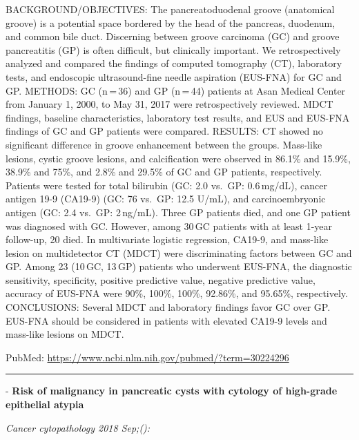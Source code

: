 \documentclass[]{article}
\begin{document}
BACKGROUND/OBJECTIVES: The pancreatoduodenal groove (anatomical groove)
is a potential space bordered by the head of the pancreas, duodenum, and
common bile duct. Discerning between groove carcinoma (GC) and groove
pancreatitis (GP) is often difficult, but clinically important. We
retrospectively analyzed and compared the findings of computed
tomography (CT), laboratory tests, and endoscopic ultrasound-fine needle
aspiration (EUS-FNA) for GC and GP. METHODS: GC (n\,=\,36) and GP
(n\,=\,44) patients at Asan Medical Center from January 1, 2000, to May
31, 2017 were retrospectively reviewed. MDCT findings, baseline
characteristics, laboratory test results, and EUS and EUS-FNA findings
of GC and GP patients were compared. RESULTS: CT showed no significant
difference in groove enhancement between the groups. Mass-like lesions,
cystic groove lesions, and calcification were observed in 86.1\% and
15.9\%, 38.9\% and 75\%, and 2.8\% and 29.5\% of GC and GP patients,
respectively. Patients were tested for total bilirubin (GC: 2.0 vs.~GP:
0.6\,mg/dL), cancer antigen 19-9 (CA19-9) (GC: 76 vs.~GP: 12.5 U/mL),
and carcinoembryonic antigen (GC: 2.4 vs.~GP: 2\,ng/mL). Three GP
patients died, and one GP patient was diagnosed with GC. However, among
30\,GC patients with at least 1-year follow-up, 20 died. In multivariate
logistic regression, CA19-9, and mass-like lesion on multidetector CT
(MDCT) were discriminating factors between GC and GP. Among 23 (10\,GC,
13\,GP) patients who underwent EUS-FNA, the diagnostic sensitivity,
specificity, positive predictive value, negative predictive value,
accuracy of EUS-FNA were 90\%, 100\%, 100\%, 92.86\%, and 95.65\%,
respectively. CONCLUSIONS: Several MDCT and laboratory findings favor GC
over GP. EUS-FNA should be considered in patients with elevated CA19-9
levels and mass-like lesions on MDCT.

PubMed: \url{https://www.ncbi.nlm.nih.gov/pubmed/?term=30224296}

{}

{}

\begin{center}\rule{0.5\linewidth}{\linethickness}\end{center}

 - \textbf{Risk of malignancy in pancreatic cysts with cytology of
high-grade epithelial atypia}

\emph{Cancer cytopathology 2018 Sep;():}
\end{document}
